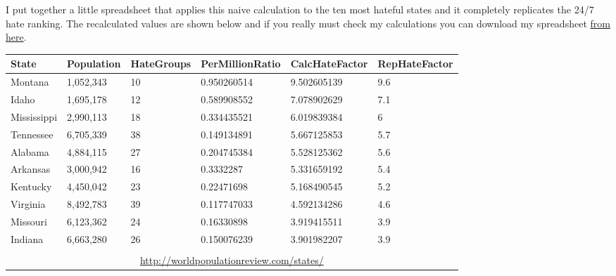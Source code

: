 I put together a little spreadsheet that applies this naive calculation
to the ten most hateful states and it completely replicates the 24/7
hate ranking. The recalculated values are shown below and if you really
must check my calculations you can download my spreadsheet
\href{https://github.com/bakerjd99/Analyze-the-Data-not-the-Drivel/blob/5381f7a91b7614b0de1cc5343eb097e20653de64/wp2latex/inclusions/hfc.xlsx}{from
here}.
\scriptsize
\begin{center}
\begin{tabular}{|l|l|l|l|l|l|} \hline
\textbf{State} & \textbf{Population} & \textbf{HateGroups} & \textbf{PerMillionRatio} & \textbf{CalcHateFactor} & \textbf{RepHateFactor} \\ \hline
Montana	       & 1,052,343           & 10                  & 0.950260514              & 9.502605139             & 9.6 \\ \hline
Idaho	       & 1,695,178           & 12                  & 0.589908552              & 7.078902629             & 7.1 \\ \hline
Mississippi	   & 2,990,113           & 18                  & 0.334435521              & 6.019839384             & 6   \\ \hline
Tennessee	   & 6,705,339           & 38                  & 0.149134891              & 5.667125853             & 5.7 \\ \hline
Alabama	       & 4,884,115           & 27                  & 0.204745384              & 5.528125362             & 5.6 \\ \hline
Arkansas	   & 3,000,942           & 16                  & 0.3332287                & 5.331659192             & 5.4 \\ \hline
Kentucky	   & 4,450,042           & 23                  & 0.22471698               & 5.168490545             & 5.2 \\ \hline
Virginia	   & 8,492,783           & 39                  & 0.117747033              & 4.592134286             & 4.6 \\ \hline
Missouri	   & 6,123,362           & 24                  & 0.16330898               & 3.919415511             & 3.9 \\ \hline
Indiana	       & 6,663,280           & 26                  & 0.150076239              & 3.901982207             & 3.9 \\ \hline
\multicolumn{6}{c}{} \\
\multicolumn{6}{c}{\href{http://worldpopulationreview.com/states/}{http://worldpopulationreview.com/states/}}
\end{tabular}
\end{center}
\normalsize

